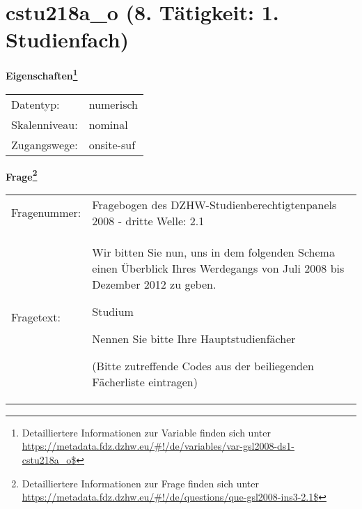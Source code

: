 
    \setcounter{footnote}{0}

    \vspace*{-1.8cm}
	\section{cstu218a\_o (8. Tätigkeit: 1. Studienfach)}
	\label{section:cstu218a_o}



    \vspace*{0.5cm}
    \noindent\textbf{Eigenschaften\footnote{Detailliertere Informationen zur Variable finden sich unter
		\url{https://metadata.fdz.dzhw.eu/\#!/de/variables/var-gsl2008-ds1-cstu218a_o$}}}\\
	\begin{tabularx}{\hsize}{@{}lX}
	Datentyp: & numerisch \\
	Skalenniveau: & nominal \\
	Zugangswege: &
	  onsite-suf
 \\
    \end{tabularx}



				\vspace*{0.5cm}
                \noindent\textbf{Frage\footnote{Detailliertere Informationen zur Frage finden sich unter
		              \url{https://metadata.fdz.dzhw.eu/\#!/de/questions/que-gsl2008-ins3-2.1$}}}\\
				\begin{tabularx}{\hsize}{@{}lX}
					Fragenummer: &
					  Fragebogen des DZHW-Studienberechtigtenpanels 2008 - dritte Welle:
					  2.1
 \\
					Fragetext: & Wir bitten Sie nun, uns in dem folgenden Schema einen Überblick Ihres Werdegangs von Juli 2008 bis Dezember 2012 zu geben.\par  Studium\par  Nennen Sie bitte Ihre Hauptstudienfächer\par  (Bitte zutreffende Codes aus der beiliegenden Fächerliste eintragen) \\
				\end{tabularx}





